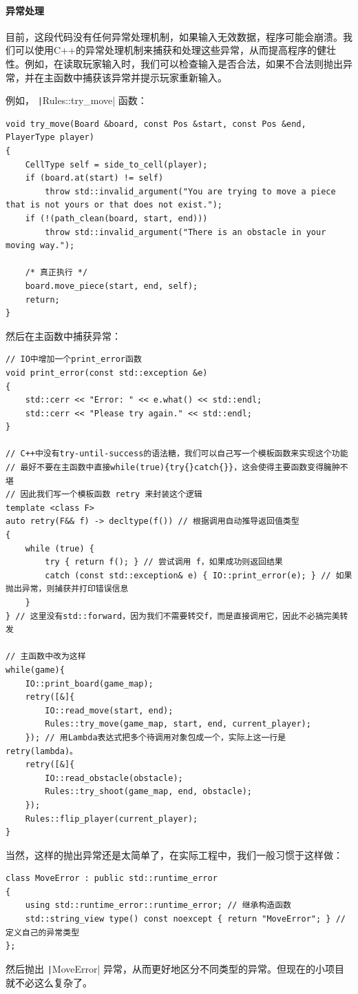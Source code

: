 \paragraph{异常处理}
目前，这段代码没有任何异常处理机制，如果输入无效数据，程序可能会崩溃。我们可以使用C++的异常处理机制来捕获和处理这些异常，从而提高程序的健壮性。例如，在读取玩家输入时，我们可以检查输入是否合法，如果不合法则抛出异常，并在主函数中捕获该异常并提示玩家重新输入。

例如， \texttt|Rules::try_move| 函数：
\begin{verbatim}
void try_move(Board &board, const Pos &start, const Pos &end, PlayerType player)
{
    CellType self = side_to_cell(player);
    if (board.at(start) != self)
        throw std::invalid_argument("You are trying to move a piece that is not yours or that does not exist.");
    if (!(path_clean(board, start, end)))
        throw std::invalid_argument("There is an obstacle in your moving way.");

    /* 真正执行 */
    board.move_piece(start, end, self);
    return;
}
\end{verbatim}
然后在主函数中捕获异常：
\begin{verbatim}
// IO中增加一个print_error函数
void print_error(const std::exception &e)
{
    std::cerr << "Error: " << e.what() << std::endl;
    std::cerr << "Please try again." << std::endl;
}

// C++中没有try-until-success的语法糖，我们可以自己写一个模板函数来实现这个功能
// 最好不要在主函数中直接while(true){try{}catch{}}，这会使得主要函数变得臃肿不堪
// 因此我们写一个模板函数 retry 来封装这个逻辑
template <class F>
auto retry(F&& f) -> decltype(f()) // 根据调用自动推导返回值类型
{
    while (true) {
        try { return f(); } // 尝试调用 f，如果成功则返回结果
        catch (const std::exception& e) { IO::print_error(e); } // 如果抛出异常，则捕获并打印错误信息
    }
} // 这里没有std::forward，因为我们不需要转交f，而是直接调用它，因此不必搞完美转发

// 主函数中改为这样
while(game){
    IO::print_board(game_map);
    retry([&]{
        IO::read_move(start, end);
        Rules::try_move(game_map, start, end, current_player);
    }); // 用Lambda表达式把多个待调用对象包成一个，实际上这一行是retry(lambda)。
    retry([&]{
        IO::read_obstacle(obstacle);
        Rules::try_shoot(game_map, end, obstacle);
    });
    Rules::flip_player(current_player);
}
\end{verbatim}
当然，这样的抛出异常还是太简单了，在实际工程中，我们一般习惯于这样做：
\begin{verbatim}
class MoveError : public std::runtime_error
{
    using std::runtime_error::runtime_error; // 继承构造函数
    std::string_view type() const noexcept { return "MoveError"; } // 定义自己的异常类型
};
\end{verbatim}
然后抛出 \texttt|MoveError| 异常，从而更好地区分不同类型的异常。但现在的小项目就不必这么复杂了。


